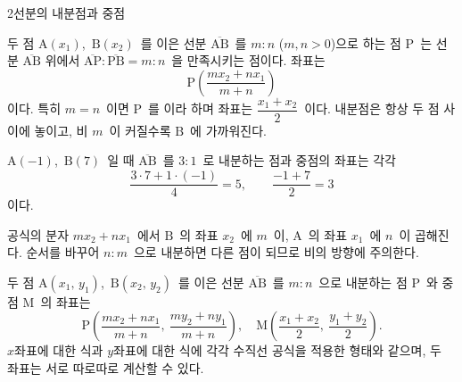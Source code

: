 \documentclass[10pt]{article}
\begin{document}
\begin{dmconcept}{2}{선분의 내분점과 중점}
\setlength{\parskip}{1.0mm plus 1.1mm minus 0mm}\linespread{1.15}\selectfont%
\setlength{\parskip}{1.6mm plus 1.4mm minus 0mm}%


두 점 $\mathrm{A}(x_1)$,\ $\mathrm{B}(x_2)$\ 를 이은 선분 $\overline{\mathrm{AB}}$\ 를 $m : n$ ($m, n > 0$)으로 하는 점 $\mathrm{P}$\ 는 선분 $\overline{\mathrm{AB}}$ 위에서 $\overline{\mathrm{AP}} : \overline{\mathrm{PB}} = m : n$\ 을 만족시키는 점이다. 좌표는
\begin{equation*}
  \mathrm{P}\!\left( \frac{m x_2 + n x_1}{m + n} \right)
\end{equation*}
이다. 특히 $m = n$\ 이면 $\mathrm{P}$\ 를 이라 하며 좌표는 $\dfrac{x_1 + x_2}{2}$\ 이다. 내분점은 항상 두 점 사이에 놓이고, 비 $m$\ 이 커질수록 $\mathrm{B}$\ 에 가까워진다.

\begin{dmexample}
$\mathrm{A}(-1)$,\ $\mathrm{B}(7)$\ 일 때 $\overline{\mathrm{AB}}$\ 를 $3 : 1$\ 로 내분하는 점과 중점의 좌표는 각각
\begin{equation*}
  \dfrac{3 \cdot 7 + 1 \cdot (-1)}{4} = 5, \qquad \dfrac{-1 + 7}{2} = 3
\end{equation*}
이다.
\end{dmexample}

\begin{dmnote}
공식의 분자 $m x_2 + n x_1$\ 에서 $\mathrm{B}$\ 의 좌표 $x_2$\ 에 $m$\ 이, $\mathrm{A}$\ 의 좌표 $x_1$\ 에 $n$\ 이 곱해진다. 순서를 바꾸어 $n : m$\ 으로 내분하면 다른 점이 되므로 비의 방향에 주의한다.
\end{dmnote}


두 점 $\mathrm{A}(x_1,\, y_1)$,\ $\mathrm{B}(x_2,\, y_2)$\ 를 이은 선분 $\overline{\mathrm{AB}}$\ 를 $m : n$\ 으로 내분하는 점 $\mathrm{P}$\ 와 중점 $\mathrm{M}$\ 의 좌표는
\begin{equation*}
  \mathrm{P}\!\left( \frac{m x_2 + n x_1}{m + n},\ \frac{m y_2 + n y_1}{m + n} \right), \quad \mathrm{M}\!\left( \frac{x_1 + x_2}{2},\ \frac{y_1 + y_2}{2} \right).
\end{equation*}
$x$좌표에 대한 식과 $y$좌표에 대한 식에 각각 수직선 공식을 적용한 형태와 같으며, 두 좌표는 서로 따로따로 계산할 수 있다.


\end{dmconcept}
\end{document}
